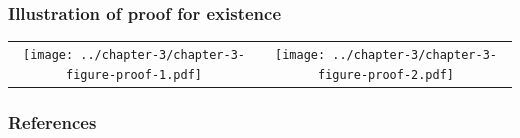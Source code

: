 \documentclass{beamer}
\begin{document}
\begin{frame}
  \frametitle{Illustration of proof for existence}
    \begin{tabular}{cc}
    \begin{minipage}{0.5\textwidth}
      \centering
      \texttt{[image: ../chapter-3/chapter-3-figure-proof-1.pdf]}
    \end{minipage}
    & \begin{minipage}{0.5\textwidth}
      \centering
      \texttt{[image: ../chapter-3/chapter-3-figure-proof-2.pdf]}
    \end{minipage}
  \end{tabular}
\end{frame}


\begin{frame}[allowframebreaks]
  \frametitle{References}
  
  
  \end{frame}
\end{document}
